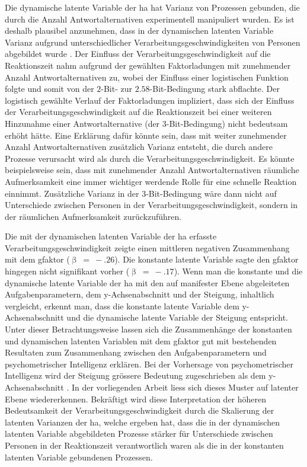 \documentclass[11pt, twoside, a4paper]{book}		%
\begin{document}
Die dynamische latente Variable der \gls{ha} hat Varianz von Prozessen gebunden, die durch die Anzahl Antwortalternativen experimentell manipuliert wurden. Es ist deshalb plausibel anzunehmen, dass in der dynamischen latenten Variable Varianz aufgrund unterschiedlicher Verarbeitungsgeschwindigkeiten von Personen abgebildet wurde \citep[][]{Jensen1998b, Roth1964}. 
Der Einfluss der Verarbeitungsgeschwindigkeit auf die Reaktionszeit nahm aufgrund der gewählten Faktorladungen mit zunehmender Anzahl Antwortalternativen zu, wobei der Einfluss einer logistischen Funktion folgte und somit von der $2$-Bit- zur $2.58$-Bit-Bedingung stark abflachte. 
Der logistisch gewählte Verlauf der Faktorladungen impliziert, dass sich der Einfluss der Verarbeitungsgeschwindigkeit auf die Reaktionszeit bei einer weiteren Hinzunahme einer Antwortalternative (der $3$-Bit-Bedingung) nicht bedeutsam erhöht hätte.
Eine Erklärung dafür könnte sein, dass mit weiter zunehmender Anzahl Antwortalternativen zusätzlich Varianz entsteht, die durch andere Prozesse verursacht wird als durch die Verarbeitungsgeschwindigkeit. Es könnte beispielsweise sein, dass mit zunehmender Anzahl Antwortalternativen räumliche Aufmerksamkeit \citep[][]{Hoffman1981} eine immer wichtiger werdende Rolle für eine schnelle Reaktion einnimmt. Zusätzliche Varianz in der $3$-Bit-Bedingung wäre dann nicht auf Unterschiede zwischen Personen in der Verarbeitungsgeschwindigkeit, sondern in der räumlichen Aufmerksamkeit zurückzuführen.

Die mit der dynamischen latenten Variable der \gls{ha} erfasste Verarbeitungsgeschwindigkeit zeigte einen mittleren negativen Zusammenhang mit dem \gls{gfaktor} ($\upbeta~=~-.26$). Die konstante latente Variable sagte den \gls{gfaktor} hingegen nicht signifikant vorher ($\upbeta~=~-.17$).
Wenn man die konstante und die dynamische latente Variable der \gls{ha} mit den auf manifester Ebene abgeleiteten Aufgabenparametern, dem y-Achsen\-ab\-schnitt und der Steigung, inhaltlich vergleicht, erkennt man, dass die konstante latente Variable dem y-Achsen\-ab\-schnitt und die dynamische latente Variable der Steigung entspricht. Unter dieser Betrachtungsweise lassen sich die Zusammenhänge der konstanten und dynamischen latenten Variablen mit dem \gls{gfaktor} gut mit bestehenden Resultaten zum Zusammenhang zwischen den Aufgabenparametern und psychometrischer Intelligenz erklären. Bei der Vorhersage von psychometrischer Intelligenz wird der Steigung grössere Bedeutung zugeschrieben als dem y-Achsen\-ab\-schnitt \citep[z.~B.][]{Jensen1987a, Jensen1998b, Roth1964}. In der vorliegenden Arbeit liess sich dieses Muster auf latenter Ebene wiedererkennen.
Bekräftigt wird diese Interpretation der höheren Bedeutsamkeit der Verarbeitungsgeschwindigkeit durch die Skalierung der latenten Varianzen der \gls{ha}, welche ergeben hat, dass die in der dynamischen latenten Variable abgebildeten Prozesse stärker für Unterschiede zwischen Personen in der Reaktionszeit verantwortlich waren als die in der konstanten latenten Variable gebundenen Prozessen.
\end{document}

